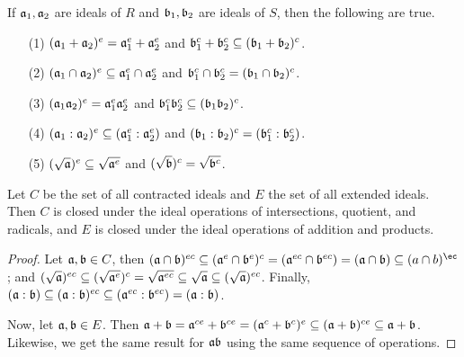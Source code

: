 \begin{lemma}\label{lemma_5.6.5}
    If $\af_1,\af_2$ are ideals of $R$ and  $\bf_1,\bf_2$ are ideals of $S$,
    then the following are true.
    \begin{enumerate}
        \item[(1)] $(\af_1+\af_2)^e=\af_1^e+\af_2^e$ and $\bf_1^c+\bf_2^c
            \subseteq (\bf_1+\bf_2)^c$.

        \item[(2)] $(\af_1 \cap \af_2)^e \subseteq \af_1^e \cap \af_2^e$ and
            $\bf_1^c \cap \bf_2^c=(\bf_1 \cap \bf_2)^c$.

        \item[(3)] $(\af_1\af_2)^e=\af_1^e\af_2^e$ and $\bf_1^c\bf_2^c
            \subseteq (\bf_1\bf_2)^c$.

        \item[(4)] $(\af_1:\af_2)^e \subseteq (\af_1^e:\af_2^e)$ and
            $(\bf_1:\bf_2)^c=(\bf_1^c:\bf_2^c)$.

        \item[(5)] $(\sqrt{\af})^e \subseteq \sqrt{\af^e}$ and
            $(\sqrt{\bf})^c=\sqrt{\bf^c}$.
    \end{enumerate}
\end{lemma}
\begin{corollary}
  Let $C$ be the set of all contracted ideals and $E$ the set of all extended
  ideals. Then $C$ is closed under the ideal operations of intersections,
  quotient, and radicals, and  $E$ is closed under the ideal operations of
  addition and products.
\end{corollary}
\begin{proof}
  Let $\af,\bf \in C$, then $(\af \cap \bf)^{ec} \subseteq (\af^e \cap
  \bf^e)^c=(\af^{ec} \cap \bf^{ec})=(\af \cap \bf) \subseteq (a \cap b)^{\ec}$;
  and $(\sqrt{\af})^{ec} \subseteq (\sqrt{\af^e})^c=\sqrt{\af^{ec}} \subseteq
  \sqrt{\af} \subseteq (\sqrt{\af})^{ec}$. Finally, $(\af:\bf) \subseteq
  (\af:\bf)^{ec} \subseteq (\af^{ec}:\bf^{ec})=(\af:\bf)$.

  Now, let $\af, \bf \in E$. Then $\af+\bf=\af^{ce}+\bf^{ce}=(\af^c+\bf^c)^e
  \subseteq (\af+\bf)^{ce} \subseteq \af+\bf$. Likewise, we get the same result
  for $\af\bf$ using the same sequence of operations.
\end{proof}
